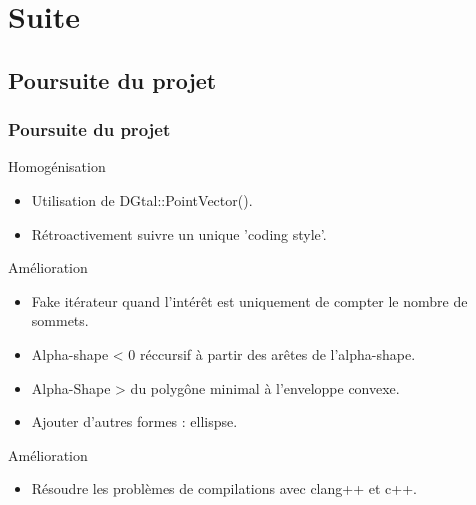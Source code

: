 \documentclass{beamer}
\begin{document}
\section{Suite}

\subsection{Poursuite du projet}
\begin{frame}
\frametitle{Poursuite du projet}

  \begin{block}{Homogénisation}
    \begin{itemize}
      \item Utilisation de DGtal::PointVector().
      \item Rétroactivement suivre un unique 'coding style'.
    \end{itemize}    
  \end{block}
  \begin{block}{Amélioration}
    \begin{itemize}       
      \item Fake itérateur quand l'intérêt est uniquement de compter le nombre de sommets.
      \item Alpha-shape < 0 réccursif à partir des arêtes de l'alpha-shape.
      \item Alpha-Shape > du polygône minimal à l'enveloppe convexe.
      \item Ajouter d'autres formes : ellispse.
    \end{itemize} 
  \end{block}
    \begin{block}{Amélioration}
      \begin{itemize} 
         \item Résoudre les problèmes de compilations avec clang++ et c++.
      \end{itemize} 
    \end{block}
\end{frame}
\end{document}
